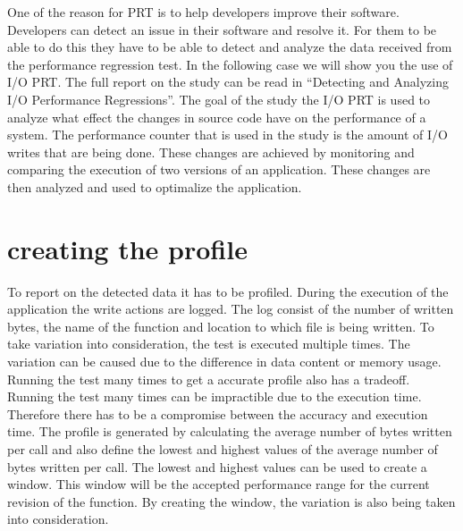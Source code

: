 \label{chapter:first}

One of the reason for PRT is to help developers improve their software. Developers can detect an issue in their software and resolve it. For them to be able to do this they have to be able to detect and analyze the data received from the performance regression test. In the following case we will show you the use of I/O PRT. The full report on the study can be read in ``Detecting and Analyzing I/O Performance Regressions''. \newline
The goal of the study the I/O PRT is used to analyze what effect the changes in source code have on the performance of a system. The performance counter that is used in the study is the amount of I/O writes that are being done. These changes are achieved by monitoring and comparing the execution of two versions of an application. These changes are then analyzed and used to optimalize the application. \newline

\section*{creating the profile}
To report on the detected data it has to be profiled. During the execution of the application the write actions are logged. The log consist of the number of written bytes, the name of the function and location to which file is being written. To take variation into consideration, the test is executed multiple times. The variation can be caused due to the difference in data content or memory usage. Running the test many times to get a accurate profile also has a tradeoff. Running the test many times can be impractible due to the execution time. Therefore there has to be a compromise between the accuracy and execution time. \newline
The profile is generated by calculating the average number of bytes written per call and also define the lowest and highest values of the average number of bytes written per call. The lowest and highest values can be used to create a window. This window will be the accepted performance range for the current revision of the function. By creating the window, the variation is also being taken into consideration.

